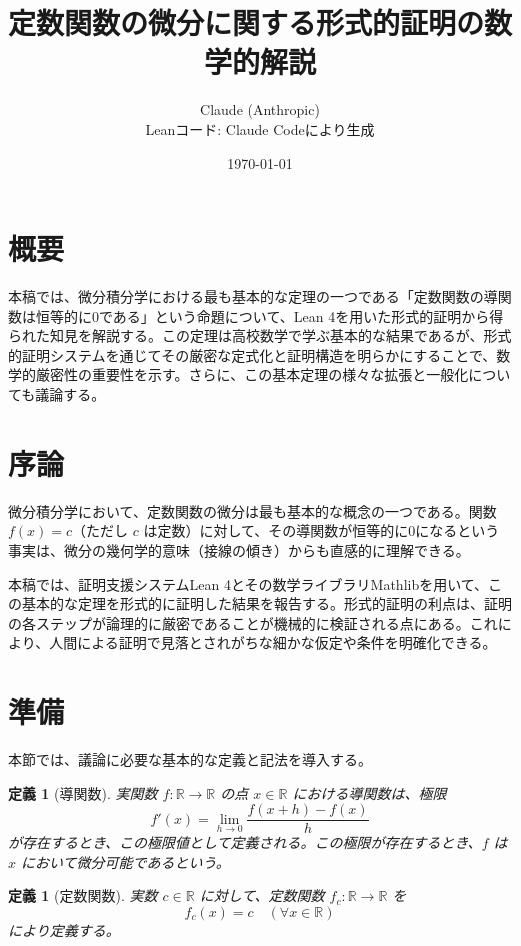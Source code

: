 \documentclass[uplatex, a4paper]{jlreq}
\title{定数関数の微分に関する形式的証明の数学的解説}
\author{Claude (Anthropic) \\ {\small Leanコード: Claude Codeにより生成}}
\date{\today}
\newtheorem{definition}[theorem]{定義}
\begin{document}
\maketitle

\section*{概要}

本稿では、微分積分学における最も基本的な定理の一つである「定数関数の導関数は恒等的に0である」という命題について、Lean 4を用いた形式的証明から得られた知見を解説する。この定理は高校数学で学ぶ基本的な結果であるが、形式的証明システムを通じてその厳密な定式化と証明構造を明らかにすることで、数学的厳密性の重要性を示す。さらに、この基本定理の様々な拡張と一般化についても議論する。

\section{序論}

微分積分学において、定数関数の微分は最も基本的な概念の一つである。関数 $f(x) = c$（ただし $c$ は定数）に対して、その導関数が恒等的に0になるという事実は、微分の幾何学的意味（接線の傾き）からも直感的に理解できる。

本稿では、証明支援システムLean 4とその数学ライブラリMathlibを用いて、この基本的な定理を形式的に証明した結果を報告する。形式的証明の利点は、証明の各ステップが論理的に厳密であることが機械的に検証される点にある。これにより、人間による証明で見落とされがちな細かな仮定や条件を明確化できる。

\section{準備}

本節では、議論に必要な基本的な定義と記法を導入する。

\begin{definition}[導関数]
実関数 $f: \mathbb{R} \to \mathbb{R}$ の点 $x \in \mathbb{R}$ における導関数は、極限
\[
f'(x) = \lim_{h \to 0} \frac{f(x+h) - f(x)}{h}
\]
が存在するとき、この極限値として定義される。この極限が存在するとき、$f$ は $x$ において微分可能であるという。
\end{definition}

\begin{definition}[定数関数]
実数 $c \in \mathbb{R}$ に対して、定数関数 $f_c: \mathbb{R} \to \mathbb{R}$ を
\[
f_c(x) = c \quad (\forall x \in \mathbb{R})
\]
により定義する。
\end{definition}
\end{document}
